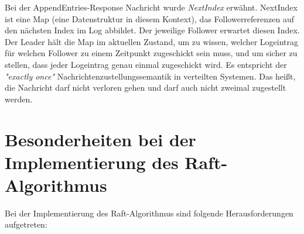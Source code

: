 Bei der AppendEntries-Response Nachricht wurde \textit{NextIndex} erwähnt. NextIndex ist eine Map (eine Datenstruktur in diesem Kontext), das Followerreferenzen auf den nächsten Index im Log abbildet. Der jeweilige Follower erwartet diesen Index. Der Leader hält die Map im aktuellen Zustand, um zu wissen, welcher Logeintrag für welchen Follower zu einem Zeitpunkt zugeschickt sein muss, und um sicher zu stellen, dass jeder Logeintrag genau einmal zugeschickt wird. Es entspricht der \textit{"exactly once"} Nachrichtenzustellungssemantik in verteilten Systemen. Das heißt, die Nachricht darf nicht verloren gehen und darf auch nicht zweimal zugestellt werden.

\section{Besonderheiten bei der Implementierung des Raft-Algorithmus}

Bei der Implementierung des Raft-Algorithmus sind folgende Herausforderungen aufgetreten:

